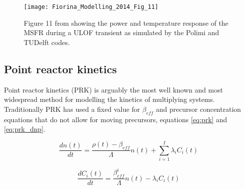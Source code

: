 \documentclass[review]{elsarticle}
\begin{document}
\begin{figure}[h]
   \centering
   \texttt{[image: Fiorina\_Modelling\_2014\_Fig\_11]}
   \caption{Figure 11 from \cite{fiorina_modelling_2014} showing the power and temperature
   response of the MSFR during a ULOF transient as simulated by the Polimi and TUDelft codes.} 
   \label{fig:fiorina_msfr_ulof}
\end{figure}

\subsection{Point reactor kinetics} \label{ssec:prk}
Point reactor kinetics (PRK) is arguably the most well known and most widespread
method for modelling the kinetics of multiplying systems. Traditionally PRK
has used a fixed value for $\beta_{eff}$ and precursor concentration equations
that do not allow for moving precursors, equations \ref{eq:prk} and
\ref{eq:prk_dnp}.

\begin{equation}
    \label{eq:prk}
    \frac{dn(t)}{dt} = \frac{\rho(t) - \beta_{eff}}{\Lambda} n(t) +
     \sum_{i = 1}^{I} \lambda_{i} C_{i}(t)
\end{equation}

\begin{equation}
    \label{eq:prk_dnp}
    \frac{dC_{i}(t)}{dt} = \frac{\beta_{eff}^{i}}{\Lambda} n(t) -
        \lambda_{i} C_{i}(t)
\end{equation}
\end{document}
